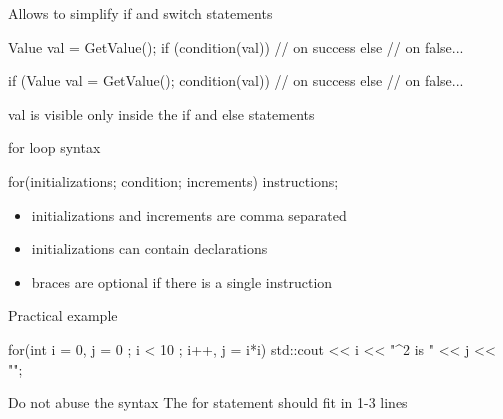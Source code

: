 \begin{frame}[fragile]
  Allows to simplify if and switch statements
  \begin{alertblock}{}
    \begin{cppcode*}{}
      Value val = GetValue();
      if (condition(val)) {
        // on success
      } else {
        // on false...
      }
    \end{cppcode*}
  \end{alertblock}
  \begin{exampleblock}{}
    \begin{cppcode*}{}
      if (Value val = GetValue(); condition(val)) {
        // on success
      } else {
        // on false...
      }
    \end{cppcode*}
    \vspace{-.1cm}
    val is visible only inside the if and else statements
  \end{exampleblock}  
\end{frame}

\begin{frame}[fragile]
  \begin{block}{for loop syntax}
    \begin{cppcode*}{}
      for(initializations; condition; increments) {
        instructions;
      }
    \end{cppcode*}
    \vspace{-0.2cm}
    \begin{itemize}
      \item initializations and increments are comma separated
      \item initializations can contain declarations
      \item braces are optional if there is a single instruction
    \end{itemize}
  \end{block}
  \pause
  \begin{exampleblock}{Practical example}
    \begin{cppcode*}{}
      for(int i = 0, j = 0 ; i < 10 ; i++, j = i*i) {
        std::cout << i << "^2 is " << j << "\n";
      }
    \end{cppcode*}
  \end{exampleblock}
  \pause
  \begin{alertblock}{Do not abuse the syntax}
    The for statement should fit in 1-3 lines
  \end{alertblock}
\end{frame}

